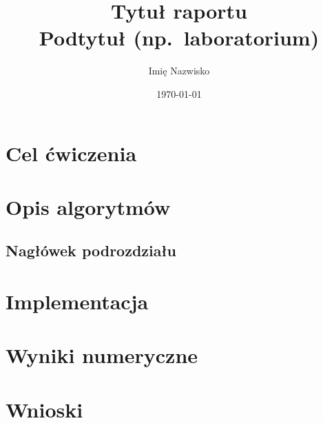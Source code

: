 \documentclass[polish]{template/projectreport}
\title{Tytuł raportu\\{\large Podtytuł (np.\ laboratorium)}}
\author{Imię Nazwisko}
\date{\today}
\begin{document}
\maketitle

\section{Cel ćwiczenia}

\section{Opis algorytmów}

\subsection{Nagłówek podrozdziału}

\section{Implementacja}

\section{Wyniki numeryczne}

\section{Wnioski}
\end{document}
